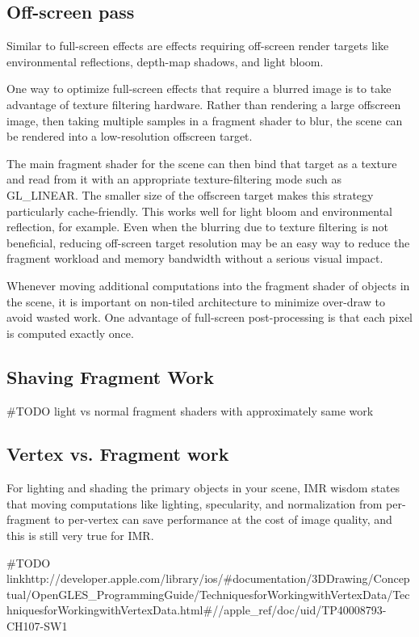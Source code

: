 \subsection{Off-screen pass}

Similar to full-screen effects are effects requiring off-screen render targets like environmental reflections, depth-map shadows, and light bloom.

One way to optimize full-screen effects that require a blurred image is to take
advantage of texture filtering hardware.  Rather than rendering a large
offscreen image, then taking multiple samples in a fragment shader to blur, the
scene can be rendered into a low-resolution offscreen target.  

The main fragment shader for the scene can then bind that target as a texture
and read from it with an appropriate texture-filtering mode such as GL_LINEAR.
The smaller size of the offscreen target makes this strategy particularly
cache-friendly.  This works well for light bloom and environmental reflection,
for example.  Even when the blurring due to texture filtering is not
beneficial, reducing off-screen target resolution may be an easy way to reduce
the fragment workload and memory bandwidth without a serious visual impact.

Whenever moving additional computations into the fragment shader of objects in
the scene, it is important on non-tiled architecture to minimize over-draw to
avoid wasted work.  One advantage of full-screen post-processing is that each
pixel is computed exactly once.

\subsection{Shaving Fragment Work}

#TODO light vs normal fragment shaders with approximately same work

\subsection{Vertex vs. Fragment work}

For lighting and shading the primary objects in your scene, IMR wisdom states that moving computations like lighting, specularity, and normalization from per-fragment to per-vertex can save performance at the cost of image quality, and this is still very true for IMR.

#TODO linkhttp://developer.apple.com/library/ios/#documentation/3DDrawing/Conceptual/OpenGLES_ProgrammingGuide/TechniquesforWorkingwithVertexData/TechniquesforWorkingwithVertexData.html#//apple_ref/doc/uid/TP40008793-CH107-SW1

